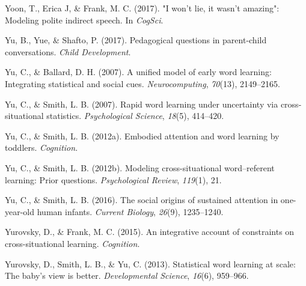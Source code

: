 \documentclass[oneside]{report}
\begin{document}
\leavevmode\hypertarget{ref-yoonwon}{}%
Yoon, T., Erica J, \& Frank, M. C. (2017). "I won't lie, it wasn't
amazing": Modeling polite indirect speech. In \emph{CogSci}.

\leavevmode\hypertarget{ref-yu2017peagogical}{}%
Yu, B., Yue, \& Shafto, P. (2017). Pedagogical questions in parent-child
conversations. \emph{Child Development}.

\leavevmode\hypertarget{ref-yu2007unified}{}%
Yu, C., \& Ballard, D. H. (2007). A unified model of early word
learning: Integrating statistical and social cues.
\emph{Neurocomputing}, \emph{70}(13), 2149--2165.

\leavevmode\hypertarget{ref-yu2007rapid}{}%
Yu, C., \& Smith, L. B. (2007). Rapid word learning under uncertainty
via cross-situational statistics. \emph{Psychological Science},
\emph{18}(5), 414--420.

\leavevmode\hypertarget{ref-yu2012embodied}{}%
Yu, C., \& Smith, L. B. (2012a). Embodied attention and word learning by
toddlers. \emph{Cognition}.

\leavevmode\hypertarget{ref-yu2012modeling}{}%
Yu, C., \& Smith, L. B. (2012b). Modeling cross-situational
word--referent learning: Prior questions. \emph{Psychological Review},
\emph{119}(1), 21.

\leavevmode\hypertarget{ref-yu2016social}{}%
Yu, C., \& Smith, L. B. (2016). The social origins of sustained
attention in one-year-old human infants. \emph{Current Biology},
\emph{26}(9), 1235--1240.

\leavevmode\hypertarget{ref-yurovsky2014algorithmic}{}%
Yurovsky, D., \& Frank, M. C. (2015). An integrative account of
constraints on cross-situational learning. \emph{Cognition}.

\leavevmode\hypertarget{ref-yurovsky2013statistical}{}%
Yurovsky, D., Smith, L. B., \& Yu, C. (2013). Statistical word learning
at scale: The baby's view is better. \emph{Developmental Science},
\emph{16}(6), 959--966.


\end{document}
